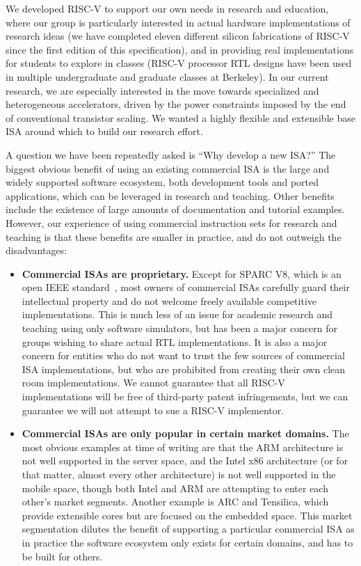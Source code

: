 \begin{commentary}
We developed RISC-V to support our own needs in research and
education, where our group is particularly interested in actual
hardware implementations of research ideas (we have completed eleven
different silicon fabrications of RISC-V since the first edition of
this specification), and in providing real implementations for
students to explore in classes (RISC-V processor RTL designs have been
used in multiple undergraduate and graduate classes at Berkeley).  In
our current research, we are especially interested in the move towards
specialized and heterogeneous accelerators, driven by the power
constraints imposed by the end of conventional transistor scaling.  We
wanted a highly flexible and extensible base ISA around which to build
our research effort.

A question we have been repeatedly asked is ``Why develop a new ISA?''
The biggest obvious benefit of using an existing commercial ISA is the
large and widely supported software ecosystem, both development tools
and ported applications, which can be leveraged in research and
teaching.  Other benefits include the existence of large amounts of
documentation and tutorial examples.  However, our experience of using
commercial instruction sets for research and teaching is that these
benefits are smaller in practice, and do not outweigh the
disadvantages:

\begin{itemize}
\item {\bf Commercial ISAs are proprietary.}  Except for SPARC V8,
  which is an open IEEE standard~\cite{sparcieee1994}, most owners of
  commercial ISAs carefully guard their intellectual property and do
  not welcome freely available competitive implementations.  This is
  much less of an issue for academic research and teaching using only
  software simulators, but has been a major concern for groups wishing
  to share actual RTL implementations.  It is also a major concern for
  entities who do not want to trust the few sources of commercial ISA
  implementations, but who are prohibited from creating their own
  clean room implementations.  We cannot guarantee that all RISC-V
  implementations will be free of third-party patent infringements,
  but we can guarantee we will not attempt to sue a RISC-V
  implementor.

\item {\bf Commercial ISAs are only popular in certain market
  domains.}  The most obvious examples at time of writing are that
  the ARM architecture is not well supported in the server space, and
  the Intel x86 architecture (or for that matter, almost every other
  architecture) is not well supported in the mobile space, though both
  Intel and ARM are attempting to enter each other's market segments.
  Another example is ARC and Tensilica, which provide extensible cores
  but are focused on the embedded space.  This market segmentation
  dilutes the benefit of supporting a particular commercial ISA as in
  practice the software ecosystem only exists for certain domains, and
  has to be built for others.


\end{itemize}
\end{commentary}
